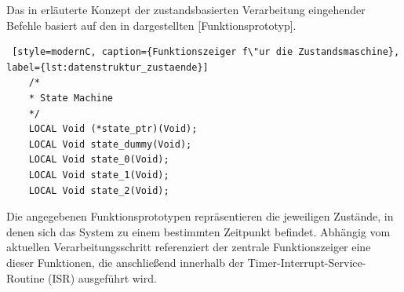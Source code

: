 Das in  erl\"auterte Konzept der zustandsbasierten Verarbeitung eingehender Befehle basiert auf den in  dargestellten [Funktionsprototyp].

\vspace{0.5cm}
\begin{lstlisting} [style=modernC, caption={Funktionszeiger f\"ur die Zustandsmaschine}, label={lst:datenstruktur_zustaende}]
	/*
	* State Machine
	*/
	LOCAL Void (*state_ptr)(Void);
	LOCAL Void state_dummy(Void);
	LOCAL Void state_0(Void);
	LOCAL Void state_1(Void);
	LOCAL Void state_2(Void);
\end{lstlisting}

Die angegebenen Funktionsprototypen repr\"asentieren die jeweiligen Zust\"ande, in denen sich das System zu einem bestimmten Zeitpunkt befindet. Abh\"angig vom aktuellen Verarbeitungsschritt referenziert der zentrale Funktionszeiger  eine dieser Funktionen, die anschließend innerhalb der Timer-Interrupt-Service-Routine (ISR) ausgef\"uhrt wird.


